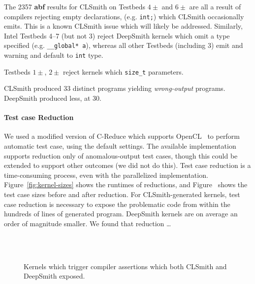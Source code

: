 

The 2357 \textbf{abf} results for CLSmith on Testbeds $4\pm$ and $6\pm$ are all a result of compilers rejecting empty declarations, (e.g. \texttt{int;}) which CLSmith occasionally emits. This is a known CLSmith issue which will likely be addressed.
Similarly, Intel Testbeds 4--7 (but not 3) reject DeepSmith kernels which omit a type specified (e.g. \texttt{\_\_global* a}), whereas all other Testbeds (including 3) emit and warning and default to \texttt{int} type.

Testbeds $1\pm$, $2\pm$ reject kernels which \texttt{size\_t} parameters.

CLSmith produced 33 distinct programs yielding \emph{wrong-output} programs. DeepSmith produced less, at 30.


\paragraph{Test case Reduction} We used a modified version of C-Reduce which supports OpenCL~\cite{Pflanzer2016} to perform automatic test case, using the default settings. The available implementation supports reduction only of anomalous-output test cases, though this could be extended to support other outcomes (we did not do this). Test case reduction is a time-consuming process, even with the parallelized implementation. Figure~\ref{fig:kernel-sizes} shows the runtimes of reductions, and Figure~ shows the test case sizes before and after reduction. For CLSmith-generated kernels, test case reduction is necessary to expose the problematic code from within the hundreds of lines of generated program. DeepSmith kernels are on average an order of magnitude smaller. We found that reduction \ldots


\begin{figure}
  \centering %
  \\%
  \\%
  \caption{Kernels which trigger compiler assertions which both CLSmith and DeepSmith exposed.}%
  \label{lst:clsmith-compiler-assertions}%
\end{figure}


